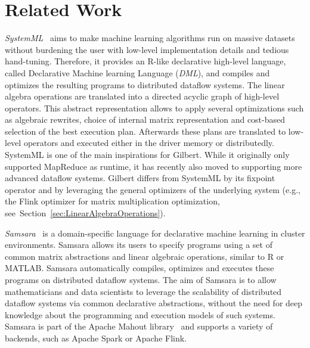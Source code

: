 \section{Related Work}
\label{sec:relatedWork}

{\em SystemML}~\cite{ghoting:2011a,Boehm2014,Boehm2014Hybrid,Schelter2015,Elgohary2016} aims to make machine learning algorithms run on massive datasets without burdening the user with low-level implementation details and tedious hand-tuning. 
Therefore, it provides an R-like declarative high-level language, called Declarative Machine learning Language (\emph{DML}), and compiles and optimizes the resulting programs to distributed dataflow systems. 
The linear algebra operations are translated into a directed acyclic graph of high-level operators. 
This abstract representation allows to apply several optimizations such as algebraic rewrites, choice of internal matrix representation and cost-based selection of the best execution plan. 
Afterwards these plans are translated to low-level operators and executed either in the driver memory or distributedly. 
SystemML is one of the main inspirations for Gilbert. 
While it originally only supported MapReduce as runtime, it has recently also moved to supporting more advanced dataflow systems. 
Gilbert differs from SystemML by its fixpoint operator and by leveraging the general optimizers of the underlying system (e.g., the Flink optimizer for matrix multiplication optimization, see~Section~\ref{sec:LinearAlgebraOperations}). 

{\em Samsara}~\cite{Lyubimov2016} is a domain-specific language for declarative machine learning in cluster environments. 
Samsara allows its users to specify programs using a set of common matrix abstractions and linear algebraic operations, similar to R or MATLAB.
Samsara automatically compiles, optimizes and executes these programs on distributed dataflow systems. 
The aim of Samsara is to allow mathematicians and data scientists to leverage the scalability of distributed dataflow systems via common declarative abstractions, without the need for deep knowledge about the programming and execution models of such systems. 
Samsara is part of the Apache Mahout library~\cite{mahout:2011a} and supports a variety of backends, such as Apache Spark or Apache Flink. 

